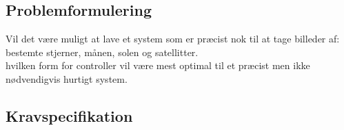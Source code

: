 
\subsection{Problemformulering}

Vil det være muligt at lave et system som er præcist nok til at tage billeder af: bestemte stjerner, månen, solen og satellitter.\\
hvilken form for controller vil være mest optimal til et præcist men ikke nødvendigvis hurtigt system.



\subsection{Kravspecifikation}

